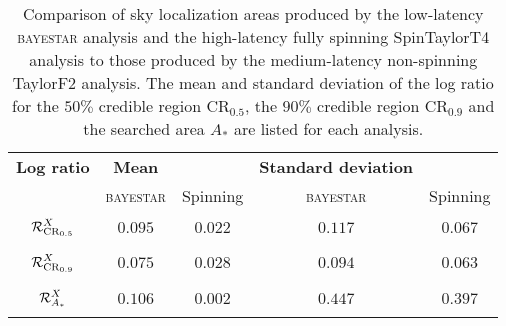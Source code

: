 \begin{table}
\begin{tabular}{ccccc}
\textbf{Log ratio} & \textbf{Mean} & & \textbf{Standard deviation} & \\   
 & \textsc{bayestar} & Spinning & \textsc{bayestar} & Spinning \\
$\displaystyle \vphantom{\frac{0}{0}} \mathcal{R}^X_{\mathrm{CR}_{0.5}}$ & $0.095$ & $0.022$ & $0.117$ & $0.067$ \\
$\displaystyle \vphantom{\frac{0}{0}} \mathcal{R}^X_{\mathrm{CR}_{0.9}}$ & $0.075$ & $0.028$ & $0.094$ & $0.063$ \\
$\displaystyle \vphantom{\frac{0}{0}} \mathcal{R}^X_{A_\ast}$ & $0.106$ & $0.002$ & $0.447$ & $0.397$
\end{tabular}
\label{tab:sky-ratio} \caption{Comparison of sky localization areas produced by the low-latency \textsc{bayestar} analysis and the high-latency fully spinning SpinTaylorT4 analysis to those produced by the medium-latency non-spinning TaylorF2 analysis. The mean and standard deviation of the log ratio for the $50\%$ credible region $\mathrm{CR}_{0.5}$, the $90\%$ credible region $\mathrm{CR}_{0.9}$ and the searched area $A_\ast$ are listed for each analysis.}

\end{table}
  
  
  
  